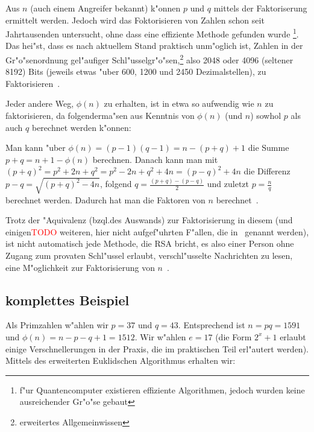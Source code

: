 \documentclass[12pt]{article}
\newcommand{\todo}[1]{\textcolor{red}{\mbox{TODO}}\marginpar{\textcolor{red}{#1}}}
\begin{document}
Aus $n$ (auch einem Angreifer bekannt) k"onnen $p$ und $q$ mittels der Faktoriserung ermittelt werden.
Jedoch wird das Foktorisieren von Zahlen schon seit Jahrtausenden untersucht,
ohne dass eine effiziente Methode gefunden wurde%
\footnote{f"ur Quantencomputer existieren effiziente Algorithmen,
jedoch wurden keine ausreichender Gr"o"se gebaut}.
Das hei"st, dass es nach aktuellem Stand praktisch unm"oglich ist,
Zahlen in der Gr"o"senordnung gel"aufiger Schl"usselgr"o"sen,\footnote{erweitertes Allgemeinwissen}
also 2048 oder 4096 (seltener 8192) Bits (jeweils etwas "uber 600, 1200 und 2450 Dezimalstellen),
zu Faktorisieren~\cite{sinews}.

Jeder andere Weg, $\phi(n)$ zu erhalten, ist in etwa so aufwendig wie $n$ zu faktorisieren,
da folgenderma"sen aus Kenntnis von $\phi(n)$ (und $n$) sowhol $p$ als auch $q$ berechnet werden k"onnen:

Man kann "uber $\phi(n) = (p-1)(q-1) = n - (p+q) + 1$ die Summe $p+q = n + 1 - \phi(n)$ berechnen.
Danach kann man mit $(p+q)^2 = p^2 + 2n + q^2 = p^2 - 2n + q^2 + 4n = (p-q)^2 + 4n$
die Differenz $p-q = \sqrt{(p+q)^2 - 4n}$, folgend $q = \frac{(p+q) - (p-q)}{2}$
und zuletzt $p = \frac{n}{q}$ berechnet werden.
Dadurch hat man die Faktoren von $n$ berechnet~\cite{rsa}.

Trotz der "Aquivalenz (bzql.\@ des Auswands) zur Faktorisierung in diesem (und einigen\todo{eigentlich nur einer} weiteren,
hier nicht aufgef"uhrten F"allen, die in~\cite{rsa} genannt werden),
ist nicht automatisch jede Methode, die RSA bricht,
es also einer Person ohne Zugang zum provaten Schl"ussel erlaubt, verschl"usselte Nachrichten zu lesen,
eine M"oglichkeit zur Faktorisierung von $n$~\cite{sinews}.

\subsection{komplettes Beispiel}

Als Primzahlen w"ahlen wir $p = 37$ und $q = 43$.
Entsprechend ist $n = pq = 1591$ und $\phi(n) = n - p - q + 1 = 1512$.
Wir w"ahlen $e = 17$ (die Form $2^x+1$ erlaubt einige Verschnellerungen in der Praxis, die im praktischen Teil erl"autert werden).
Mittels des erweiterten Euklidschen Algorithmus erhalten wir:\\
\end{document}
